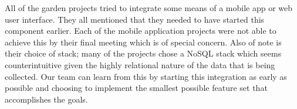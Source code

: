All of the garden projects tried to integrate some means of a mobile app or web user interface. They all mentioned that they needed to have started this component earlier. Each of the mobile application projects were not able to achieve this by their final meeting which is of special concern. Also of note is their choice of stack; many of the projects chose a NoSQL stack which seems counterintuitive given the highly relational nature of the data that is being collected. Our team can learn from this by starting this integration as early as possible and choosing to implement the smallest possible feature set that accomplishes the goals.
